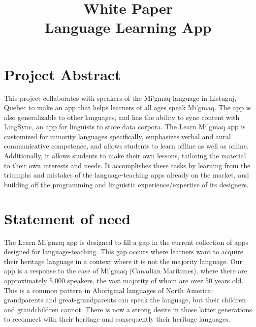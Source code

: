 \documentclass[12pt]{article} %
\title{White Paper \\ Language Learning App} %
\author{}
\date{}
\begin{document}


\maketitle{} 

\tableofcontents  %


\section{Project Abstract}

This project collaborates with speakers of the Mi'gmaq language in Listuguj, Quebec to make an app that helps learners of all ages speak Mi'gmaq. The app is also generalizable to other languages, and has the ability to sync content with LingSync, an app for linguists to store data corpora. The Learn Mi'gmaq app is customized for minority languages specifically, emphasizes verbal and aural communicative competence, and allows students to learn offline as well as online. Additionally, it allows students to make their own lessons, tailoring the material to their own interests and needs. It accomplishes these tasks by learning from the triumphs and mistakes of the language-teaching apps already on the market, and building off the programming and linguistic experience/expertise of its designers.  


\section{Statement of need} 

The Learn Mi'gmaq app is designed to fill a gap in the current collection of apps designed for language-teaching. This gap occurs where learners want to acquire their heritage language in a context where it is not the majority language. Our app is a response to the case of Mi'gmaq (Canadian Maritimes), where there are approximately 5,000 speakers, the vast majority of whom are over 50 years old. This is a common pattern in Aboriginal languages of North America: grandparents and great-grandparents can speak the language, but their children and grandchildren cannot. There is now a strong desire in those latter generations to reconnect with their heritage and consequently their heritage languages.
\end{document}
